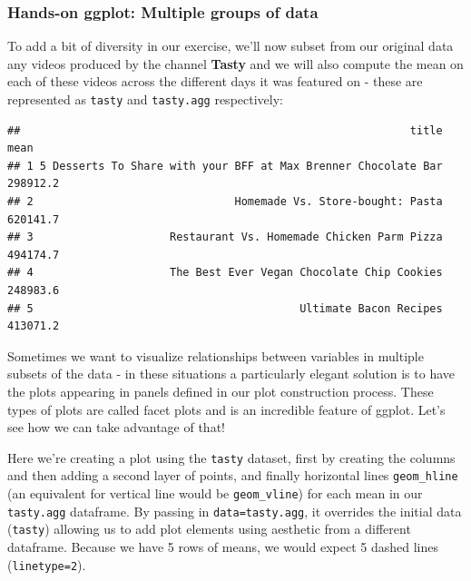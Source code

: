 \documentclass[]{article}
\newenvironment{Shaded}{\begin{snugshade}}{\end{snugshade}}
\newcommand{\DataTypeTok}[1]{\textcolor[rgb]{0.13,0.29,0.53}{#1}}
\newcommand{\KeywordTok}[1]{\textcolor[rgb]{0.13,0.29,0.53}{\textbf{#1}}}
\newcommand{\NormalTok}[1]{#1}
\newcommand{\OperatorTok}[1]{\textcolor[rgb]{0.81,0.36,0.00}{\textbf{#1}}}
\newcommand{\StringTok}[1]{\textcolor[rgb]{0.31,0.60,0.02}{#1}}
\begin{document}
\hypertarget{hands-on-ggplot-multiple-groups-of-data}{%
\subsubsection{Hands-on ggplot: Multiple groups of
data}\label{hands-on-ggplot-multiple-groups-of-data}}

To add a bit of diversity in our exercise, we'll now subset from our
original data any videos produced by the channel \textbf{Tasty} and we
will also compute the mean on each of these videos across the different
days it was featured on - these are represented as \texttt{tasty} and
\texttt{tasty.agg} respectively:

\begin{Shaded}
\end{Shaded}

\begin{verbatim}
##                                                            title     mean
## 1 5 Desserts To Share with your BFF at Max Brenner Chocolate Bar 298912.2
## 2                               Homemade Vs. Store-bought: Pasta 620141.7
## 3                     Restaurant Vs. Homemade Chicken Parm Pizza 494174.7
## 4                     The Best Ever Vegan Chocolate Chip Cookies 248983.6
## 5                                         Ultimate Bacon Recipes 413071.2
\end{verbatim}

Sometimes we want to visualize relationships between variables in
multiple subsets of the data - in these situations a particularly
elegant solution is to have the plots appearing in panels defined in our
plot construction process. These types of plots are called facet plots
and is an incredible feature of ggplot. Let's see how we can take
advantage of that!

Here we're creating a plot using the \texttt{tasty} dataset, first by
creating the columns and then adding a second layer of points, and
finally horizontal lines \texttt{geom\_hline} (an equivalent for
vertical line would be \texttt{geom\_vline}) for each mean in our
\texttt{tasty.agg} dataframe. By passing in \texttt{data=tasty.agg}, it
overrides the initial data (\texttt{tasty}) allowing us to add plot
elements using aesthetic from a different dataframe. Because we have 5
rows of means, we would expect 5 dashed lines (\texttt{linetype=2}).
\end{document}
